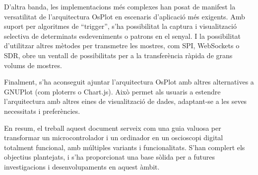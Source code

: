 \documentclass{tfgitic}[2023/06/30]
\begin{document}
D'altra banda, les implementacions més complexes han posat de manifest
la versatilitat de l'arquitectura OsPlot en escenaris d'aplicació més
exigents. Amb suport per algoritmes de ``trigger'', s'ha possibilitat
la captura i visualització selectiva de determinats esdeveniments o
patrons en el senyal. I la possibilitat d'utilitzar altres mètodes per
transmetre les mostres, com SPI, WebSockets o SDR, obre un ventall de
possibilitats per a la transferència ràpida de grans volums de
mostres.

Finalment, s'ha aconseguit ajuntar l'arquitectura OsPlot amb altres
alternatives a GNUPlot (com ploterrs o Chart.js). Això permet als
usuaris a estendre l'arquitectura amb altres eines de visualització de
dades, adaptant-se a les seves necessitats i preferències.

En resum, el treball aquest document serveix com una guia valuosa per
transformar un microcontrolador i un ordinador en un osci\lgem oscopi
digital totalment funcional, amb múltiples variants i funcionalitats.
S'han complert els objectius plantejats, i s'ha proporcionat una
base sòlida per a futures investigacions i desenvolupaments en aquest
àmbit.

\printbibliography
\end{document}
